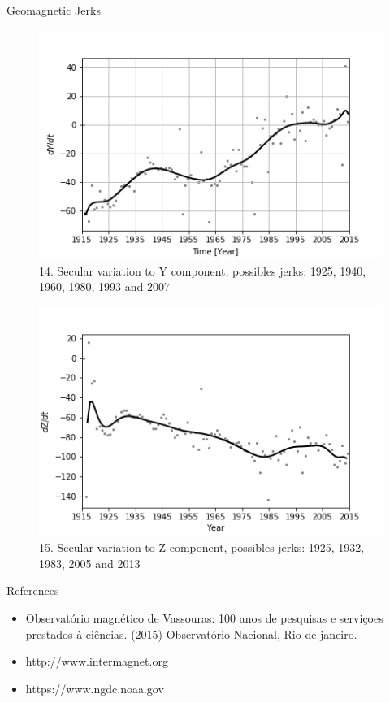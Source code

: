 \documentclass[final,t]{beamer}
\begin{document}
\begin{columns}[t]
\begin{column}{.25\linewidth}
\begin{block}{Geomagnetic Jerks}
	\begin{figure}
		\centering
		\includegraphics[width=0.8\linewidth]{spline100sv_y_spline}
		\caption{14. Secular variation to Y component, possibles jerks: 1925, 1940, 1960, 1980, 1993 and 2007}
		\label{SPLINEy}
	\end{figure}
	
	\begin{figure}
		\centering
		\includegraphics[width=0.8\linewidth]{spline100sv_z_spline}
		\caption{15. Secular variation to Z component, possibles jerks: 1925, 1932, 1983, 2005 and 2013}
		\label{Splinez}
	\end{figure}

\vspace{-0.2cm}
\end{block}

\begin{block}{References}
\begin{itemize}
	\item Observatório magnético de Vassouras: 100 anos de pesquisas e serviçoes prestados à ciências. (2015) Observatório Nacional, Rio de janeiro.
	\item http://www.intermagnet.org

	\item https://www.ngdc.noaa.gov
	
	\end{itemize}


\end{block}

\end{column}

\end{columns}
\end{document}
